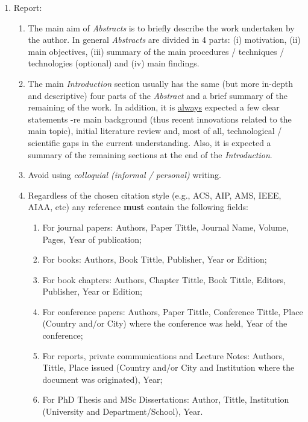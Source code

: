 \documentclass[14pt,twoside]{report}
\begin{document}
\begin{enumerate}

\item Report:
\begin{enumerate}
%
\item The main aim of {\it Abstracts} is to briefly describe the work undertaken by the author. In general {\it Abstracts} are divided in 4 parts: (i) motivation, (ii) main objectives, (iii) summary of the main procedures / techniques / technologies (optional) and (iv) main findings. 
%
\item The main {\it Introduction} section usually has the same (but more in-depth and descriptive) four parts of the {\it Abstract} and a brief summary of the remaining of the work. In addition, it is \underline{always} expected a few clear statements -re main background (thus recent innovations related to the main topic), initial literature review and, most of all, technological / scientific gaps in the current understanding. Also, it is expected a summary of the remaining sections at the end of the {\it Introduction}.
%
%
\item Avoid using {\it colloquial (informal / personal)} writing.
%
\item Regardless of the chosen citation style (e.g., ACS, AIP, AMS, IEEE, AIAA, etc) any reference {\bf must} contain the following fields: 
\begin{enumerate}
\item For journal papers: Authors, Paper Tittle, Journal Name, Volume, Pages, Year of publication;
\item For books: Authors, Book Tittle, Publisher, Year or Edition;
\item For book chapters: Authors, Chapter Tittle, Book Tittle, Editors, Publisher, Year or Edition;
\item For conference papers: Authors, Paper Tittle, Conference Tittle, Place (Country and/or City) where the conference was held, Year of the conference;
\item For reports,  private communications and Lecture Notes: Authors, Tittle, Place issued (Country and/or City and Institution where the document was originated), Year;
\item For PhD Thesis and MSc Dissertations: Author, Tittle, Institution (University and Department/School), Year.

\end{enumerate}
\end{enumerate}
\end{enumerate}
\end{document}
